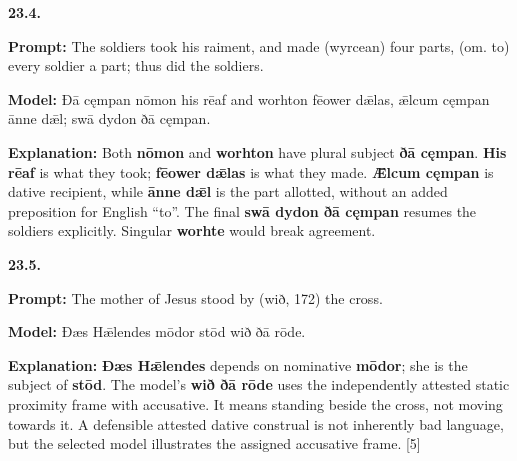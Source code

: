 \par\begin{minipage}{\linewidth}\raggedright
\textbf{23.4.}

\textbf{Prompt:} The soldiers took his raiment, and made (wyrcean) four parts, (om. to) every soldier a part; thus did the soldiers.

\textbf{Model:} Ðā cęmpan nōmon his rēaf and worhton fēower dǣlas, ǣlcum cęmpan ānne dǣl; swā dydon ðā cęmpan.

\textbf{Explanation:} Both \textbf{nōmon} and \textbf{worhton} have plural subject \textbf{ðā cęmpan}. \textbf{His rēaf} is what they took; \textbf{fēower dǣlas} is what they made. \textbf{Ǣlcum cęmpan} is dative recipient, while \textbf{ānne dǣl} is the part allotted, without an added preposition for English “to”. The final \textbf{swā dydon ðā cęmpan} resumes the soldiers explicitly. Singular \textbf{worhte} would break agreement.

\end{minipage}\par\addvspace{4pt}

\par\begin{minipage}{\linewidth}\raggedright
\textbf{23.5.}

\textbf{Prompt:} The mother of Jesus stood by (wið, 172) the cross.

\textbf{Model:} Ðæs Hǣlendes mōdor stōd wið ðā rōde.

\textbf{Explanation:} \textbf{Ðæs Hǣlendes} depends on nominative \textbf{mōdor}; she is the subject of \textbf{stōd}. The model’s \textbf{wið ðā rōde} uses the independently attested static proximity frame with accusative. It means standing beside the cross, not moving towards it. A defensible attested dative construal is not inherently bad language, but the selected model illustrates the assigned accusative frame. [5]

\end{minipage}\par\addvspace{4pt}

